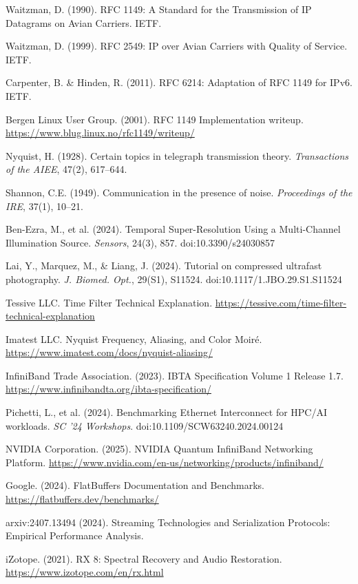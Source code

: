 \documentclass[11pt,letterpaper]{article}
\begin{document}
\begin{enumerate}[leftmargin=*, label={[\arabic*]}, itemsep=2pt]
\item Waitzman, D. (1990). RFC 1149: A Standard for the Transmission of IP Datagrams on Avian Carriers. IETF.
\item Waitzman, D. (1999). RFC 2549: IP over Avian Carriers with Quality of Service. IETF.
\item Carpenter, B. \& Hinden, R. (2011). RFC 6214: Adaptation of RFC 1149 for IPv6. IETF.
\item Bergen Linux User Group. (2001). RFC 1149 Implementation writeup. \url{https://www.blug.linux.no/rfc1149/writeup/}
\item Nyquist, H. (1928). Certain topics in telegraph transmission theory. \emph{Transactions of the AIEE}, 47(2), 617--644.
\item Shannon, C.E. (1949). Communication in the presence of noise. \emph{Proceedings of the IRE}, 37(1), 10--21.
\item Ben-Ezra, M., et al. (2024). Temporal Super-Resolution Using a Multi-Channel Illumination Source. \emph{Sensors}, 24(3), 857. doi:10.3390/s24030857
\item Lai, Y., Marquez, M., \& Liang, J. (2024). Tutorial on compressed ultrafast photography. \emph{J. Biomed. Opt.}, 29(S1), S11524. doi:10.1117/1.JBO.29.S1.S11524
\item Tessive LLC. Time Filter Technical Explanation. \url{https://tessive.com/time-filter-technical-explanation}
\item Imatest LLC. Nyquist Frequency, Aliasing, and Color Moir\'{e}. \url{https://www.imatest.com/docs/nyquist-aliasing/}
\item InfiniBand Trade Association. (2023). IBTA Specification Volume 1 Release 1.7. \url{https://www.infinibandta.org/ibta-specification/}
\item Pichetti, L., et al. (2024). Benchmarking Ethernet Interconnect for HPC/AI workloads. \emph{SC '24 Workshops}. doi:10.1109/SCW63240.2024.00124
\item NVIDIA Corporation. (2025). NVIDIA Quantum InfiniBand Networking Platform. \url{https://www.nvidia.com/en-us/networking/products/infiniband/}
\item Google. (2024). FlatBuffers Documentation and Benchmarks. \url{https://flatbuffers.dev/benchmarks/}
\item arxiv:2407.13494 (2024). Streaming Technologies and Serialization Protocols: Empirical Performance Analysis.
\item iZotope. (2021). RX 8: Spectral Recovery and Audio Restoration. \url{https://www.izotope.com/en/rx.html}

\end{enumerate}
\end{document}

